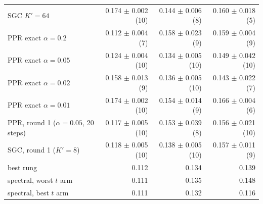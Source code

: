 {\begin{tabular}{@{}lrrr@{}}
SGC $K'{=}64$ & 0.174 $\pm$ 0.002 (10) & 0.144 $\pm$ 0.006 (8) & 0.160 $\pm$ 0.018 (5) \\
PPR exact $\alpha{=}0.2$ & 0.112 $\pm$ 0.004 (7) & 0.158 $\pm$ 0.023 (9) & 0.159 $\pm$ 0.004 (9) \\
PPR exact $\alpha{=}0.05$ & 0.124 $\pm$ 0.004 (10) & 0.134 $\pm$ 0.005 (10) & 0.149 $\pm$ 0.042 (10) \\
PPR exact $\alpha{=}0.02$ & 0.158 $\pm$ 0.013 (9) & 0.136 $\pm$ 0.005 (10) & 0.143 $\pm$ 0.022 (7) \\
PPR exact $\alpha{=}0.01$ & 0.174 $\pm$ 0.002 (10) & 0.154 $\pm$ 0.014 (9) & 0.166 $\pm$ 0.004 (6) \\
PPR, round 1 ($\alpha{=}0.05$, 20 steps) & 0.117 $\pm$ 0.005 (10) & 0.153 $\pm$ 0.039 (8) & 0.156 $\pm$ 0.021 (10) \\
SGC, round 1 ($K'{=}8$) & 0.118 $\pm$ 0.005 (10) & 0.138 $\pm$ 0.005 (10) & 0.157 $\pm$ 0.011 (9) \\
best rung & 0.112 & 0.134 & 0.139 \\
spectral, worst $t$ arm & 0.111 & 0.135 & 0.148 \\
spectral, best $t$ arm & 0.111 & 0.132 & 0.116 \\
\bottomrule
\end{tabular}
}
